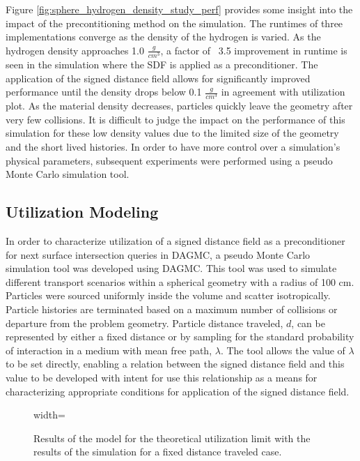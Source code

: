 Figure \ref{fig:sphere_hydrogen_density_study_perf} provides some insight into the
impact of the precontitioning method on the simulation. The runtimes
of three implementations  converge as the density of the
hydrogen is varied. As the hydrogen density approaches 1.0 $\frac{g}{cm^3}$, a
factor of ~3.5 improvement in runtime is seen in the simulation where the SDF is
applied as a preconditioner. The application of the signed distance field allows
for significantly improved performance until the density drops below 0.1
$\frac{g}{cm^3}$ in agreement with utilization plot. As the material density
decreases, particles quickly leave the geometry after very few collisions. It is
difficult to judge the impact on the performance of this simulation for these
low density values due to the limited size of the geometry and the short lived
histories.  In order to have more control over a simulation's physical
parameters, subsequent experiments were performed using a pseudo Monte Carlo
simulation tool.

\subsection{Utilization Modeling}

In order to characterize utilization of a signed distance field as a
preconditioner for next surface intersection queries in DAGMC, a pseudo Monte
Carlo simulation tool was developed using DAGMC. This tool was used to simulate
different transport scenarios within a spherical geometry with a radius of 100
cm. Particles were sourced uniformly inside the volume and scatter
isotropically. Particle histories are terminated based on a maximum number of
collisions or departure from the problem geometry. Particle distance traveled,
$d$, can be represented by either a fixed distance or by sampling for the
standard probability of interaction in a medium with mean free path,
$\lambda$. The tool allows the value of $\lambda$ to be set directly, enabling a
relation between the signed distance field and this value to be developed with
intent for use this relationship as a means for characterizing appropriate
conditions for application of the signed distance field.

\begin{figure}[H]
  \centering
  {width=\textwidth}
  \caption{Results of the model for the theoretical utilization limit with the
    results of the simulation for a fixed distance traveled case.}
  \label{fig:sdf_fixed_dist}    
\end{figure}

